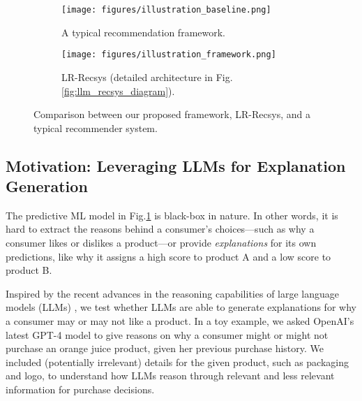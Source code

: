 \begin{figure}[hbtp!]
    \begin{subfigure}[b]{0.43\textwidth}
        \centering
        \texttt{[image: figures/illustration\_baseline.png]}
        \caption{A typical recommendation framework.}
        \label{fig:illustration_baseline}
    \end{subfigure}
    \hfill
     \centering
    \begin{subfigure}[b]{0.53\textwidth}
        \centering
        \texttt{[image: figures/illustration\_framework.png]}
        \caption{LR-Recsys (detailed architecture in Fig.\ref{fig:llm_recsys_diagram}).}
        \label{fig:illustration_framework}
    \end{subfigure}
    \caption{Comparison between our proposed framework, LR-Recsys, and a typical recommender system.}
  \label{fig:comparison}
 \vspace{-0.4cm}
\end{figure}

\subsection{Motivation: Leveraging LLMs for Explanation Generation}
\label{sec:framework_LLM_reasoning}
The predictive ML model in Fig.\ref{fig:illustration_baseline} is black-box in nature. In other words, it is hard to extract the reasons behind a consumer's choices—such as why a consumer likes or dislikes a product—or provide \emph{explanations} for its own predictions, like why it assigns a high score to product A and a low score to product B. %

Inspired by the recent advances in the reasoning capabilities of large language models (LLMs) \citep{brown2020language, lingo2024enhancing, wei2022chain}, we test whether LLMs are able to generate explanations for why a consumer may or may not like a product. In a toy example, we asked OpenAI's latest GPT-4 model \citep{achiam2023gpt} to give reasons on why a consumer might or might not purchase an orange juice product, given her previous purchase history. We included (potentially irrelevant) details for the given product, such as packaging and logo, to understand how LLMs reason through relevant and less relevant information for purchase decisions. 

